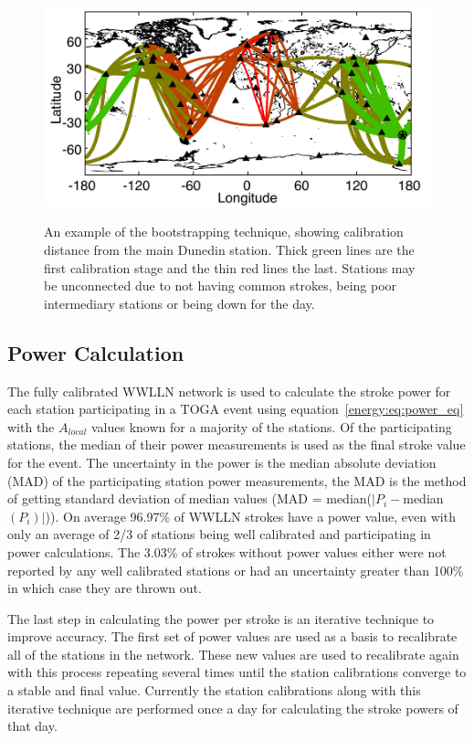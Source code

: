 \begin{figure}[ht!]
\centering
\includegraphics[scale=1]{energy/Figures/PPS_Hop.pdf}\\
\caption{An example of the bootstrapping technique, showing calibration distance from the main Dunedin station. Thick green lines are the first calibration stage and the thin red lines the last. Stations may be unconnected due to not having common strokes, being poor intermediary stations or being down for the day.}
\label{energy:fig:bootstrap}
\end{figure}

\subsection{Power Calculation}

The fully calibrated WWLLN network is used to calculate the stroke power for each station participating in a TOGA event using equation~\ref{energy:eq:power_eq} with the $A_{local}$ values known for a majority of the stations.
Of the participating stations, the median of their power measurements is used as the final stroke value for the event.
The uncertainty in the power is the median absolute deviation (MAD) of the participating station power measurements, the MAD is the method of getting standard deviation of median values (MAD = median($|P_i - $median$(P_i)|$)).
On average 96.97\% of WWLLN strokes have a power value, even with only an average of 2/3 of stations being well calibrated and participating in power calculations.
The 3.03\% of strokes without power values either were not reported by any well calibrated stations or had an uncertainty greater than 100\% in which case they are thrown out.

The last step in calculating the power per stroke is an iterative technique to improve accuracy.
The first set of power values are used as a basis to recalibrate all of the stations in the network.
These new values are used to recalibrate again with this process repeating several times until the station calibrations converge to a stable and final value.
Currently the station calibrations along with this iterative technique are performed once a day for calculating the stroke powers of that day.

